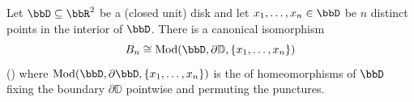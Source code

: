 \begin{proposition} \label{proposition:artin_braid_group_is_isomorphic_to_mapping_class_group_of_homeomorphisms_of_disk_with_n_punctured_points_fixing_the_boundary_and_permuting_the_punctures}
    Let $\bbD \subseteq \bbR^2$ be a (closed unit) disk and let $x_1,\ldots,x_n \in \bbD$ be $n$ distinct points in the interior of $\bbD$.
There is a canonical isomorphism
$$B_n \cong \text{Mod}(\bbD, \partial \mathbb{D}, \{x_1,\ldots,x_n\})$$
() where $\text{Mod}(\bbD, \partial \bbD, \{x_1,\ldots,x_n\})$ is the  of homeomorphisms of $\bbD$ fixing the boundary $\partial \mathbb{D}$ pointwise and permuting the punctures.
\end{proposition}